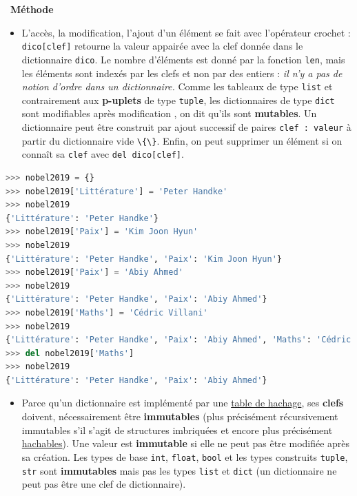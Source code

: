 \documentclass[
  11pt,
]{article}
\newcommand{\passthrough}[1]{#1}
\providecommand{\tightlist}{%
  \setlength{\itemsep}{0pt}\setlength{\parskip}{0pt}}
\newenvironment{methode}[1]
{\par \medskip    \noindent  
 \begin {bclogo}[arrondi =0.1,logo=\bcoutil, marge=4,noborder = true] {~\textbf{Méthode}   {\itshape #1} }  \par}
{
\end{bclogo}
 \par \bigskip }
\begin{document}
\begin{methode}{}

\begin{itemize}
\tightlist
\item
  L'accès, la modification, l'ajout d'un élément se fait avec
  l'opérateur crochet : \passthrough{\lstinline!dico[clef]!} retourne la
  valeur appairée avec la clef donnée dans le dictionnaire
  \passthrough{\lstinline!dico!}. Le nombre d'éléments est donné par la
  fonction \passthrough{\lstinline!len!}, mais les éléments sont indexés
  par les clefs et non par des entiers : \emph{il n'y a pas de notion
  d'ordre dans un dictionnaire.} Comme les tableaux de type
  \passthrough{\lstinline!list!} et contrairement aux \textbf{p-uplets}
  de type \passthrough{\lstinline!tuple!}, les dictionnaires de type
  \passthrough{\lstinline!dict!} sont modifiables après modification ,
  on dit qu'ils sont \textbf{mutables}. Un dictionnaire peut être
  construit par ajout successif de paires
  \passthrough{\lstinline!clef : valeur!} à partir du dictionnaire vide
  \passthrough{\lstinline!\{\}!}. Enfin, on peut supprimer un élément si
  on connaît sa \passthrough{\lstinline!clef!} avec
  \passthrough{\lstinline!del dico[clef]!}.
\end{itemize}

\begin{lstlisting}[language=Python]
>>> nobel2019 = {}
>>> nobel2019['Littérature'] = 'Peter Handke'
>>> nobel2019
{'Littérature': 'Peter Handke'}
>>> nobel2019['Paix'] = 'Kim Joon Hyun'
>>> nobel2019
{'Littérature': 'Peter Handke', 'Paix': 'Kim Joon Hyun'}
>>> nobel2019['Paix'] = 'Abiy Ahmed'
>>> nobel2019
{'Littérature': 'Peter Handke', 'Paix': 'Abiy Ahmed'}
>>> nobel2019['Maths'] = 'Cédric Villani'
>>> nobel2019
{'Littérature': 'Peter Handke', 'Paix': 'Abiy Ahmed', 'Maths': 'Cédric Villani'}
>>> del nobel2019['Maths']
>>> nobel2019
{'Littérature': 'Peter Handke', 'Paix': 'Abiy Ahmed'}
\end{lstlisting}

\begin{itemize}
\tightlist
\item
  Parce qu'un dictionnaire est implémenté par une
  \href{https://fr.wikipedia.org/wiki/Table_de_hachage}{table de
  hachage}, ses \textbf{clefs} doivent, nécessairement être
  \textbf{immutables} (plus précisément récursivement immutables s'il
  s'agit de structures imbriquées et encore plus précisément
  \href{https://docs.python.org/3/glossary.html}{hachables}). Une valeur
  est \textbf{immutable} si elle ne peut pas être modifiée après sa
  création. Les types de base \passthrough{\lstinline!int!},
  \passthrough{\lstinline!float!}, \passthrough{\lstinline!bool!} et les
  types construits \passthrough{\lstinline!tuple!},
  \passthrough{\lstinline!str!} sont \textbf{immutables} mais pas les
  types \passthrough{\lstinline!list!} et \passthrough{\lstinline!dict!}
  (un dictionnaire ne peut pas être une clef de dictionnaire).
\end{itemize}


\end{methode}
\end{document}

